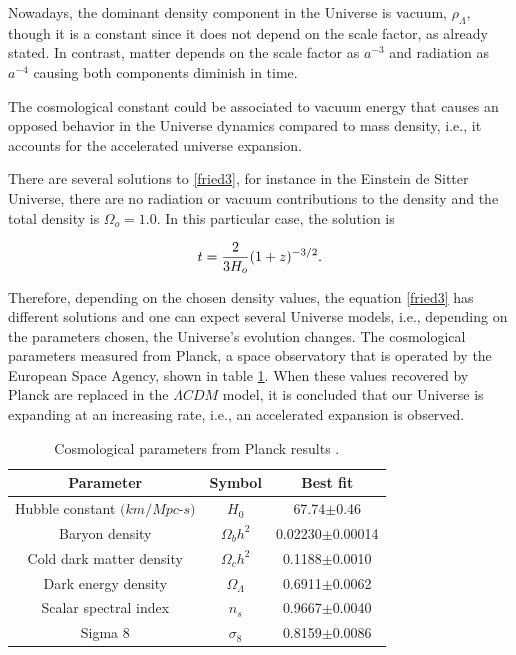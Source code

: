 Nowadays, the dominant density component in the Universe is vacuum, $\rho_{\Lambda}$, 
though it is a constant since it does not depend on the scale factor, as already
stated. In contrast, matter depends on the scale factor as $a^{-3}$ and radiation as 
$a^{-4}$ causing both components diminish in time. 

The cosmological constant could be associated to vacuum energy that causes an
opposed behavior in the Universe dynamics compared to mass density, i.e., 
it accounts for the accelerated universe expansion. 

There are several solutions to \ref{fried3}, for instance in the Einstein de 
Sitter Universe, there are no radiation or vacuum contributions to the density
and the total density is $\Omega_o=1.0$. In this particular case, the solution
is

\[
t = \frac{2}{3H_o}(1+z)^{-3/2}.
\]

Therefore, depending on the chosen density values, the equation \ref{fried3}
has different solutions and one can expect several Universe models, i.e.,
depending on the parameters chosen, the Universe's evolution changes.  
The cosmological parameters measured from Planck, a space observatory that is operated by the European
Space Agency, shown in table \ref{plancktable}. When these values recovered
by Planck are replaced in the $\Lambda CDM$ model, it is concluded that
our Universe is expanding at an increasing rate, i.e., an accelerated expansion is observed. 


\begin{table}
\begin{center}
  \begin{tabular}{ | c | c | c |}
    \hline \hline
    Parameter & Symbol & Best fit \\ \hline \hline 
    Hubble constant $(km/Mpc$-$s)$ & $H_0$ & 67.74$\pm$0.46 \\ \hline
    Baryon density & $\Omega_b h^2$ &  0.02230$\pm$0.00014 \\ \hline
    Cold dark matter density & $\Omega_c h^2$ & 0.1188$\pm$0.0010 \\  \hline
    Dark energy density & $\Omega_\Lambda$ & 0.6911$\pm$0.0062 \\ \hline
    Scalar spectral index & $n_s$ & 0.9667$\pm$0.0040 \\ \hline
    Sigma 8 & $\sigma_8$& 0.8159$\pm$0.0086 \\ \hline
  \end{tabular}
    \caption{ Cosmological parameters from Planck results \cite{planck}.}
  \label{plancktable}
\end{center}
\end{table}

